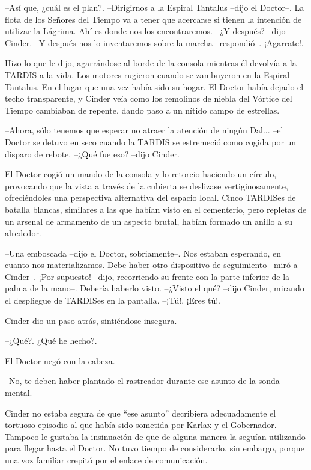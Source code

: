 --Así que, ¿cuál es el plan?.
--Dirigirnos a la Espiral Tantalus --dijo el Doctor--. La flota de los Señores del Tiempo va a tener que acercarse si tienen la intención de utilizar la Lágrima. Ahí es donde nos los encontraremos.
--¿Y después? --dijo Cinder.
--Y después nos lo inventaremos sobre la marcha --respondió--. ¡Agarrate!.

Hizo lo que le dijo, agarrándose al borde de la consola mientras él devolvía a la TARDIS a la vida. Los motores rugieron cuando se zambuyeron en la Espiral Tantalus. En el lugar que una vez había sido su hogar.
El Doctor había dejado el techo transparente, y Cinder veía como los remolinos de niebla del Vórtice del Tiempo cambiaban de repente, dando paso a un nítido campo de estrellas.

--Ahora, sólo tenemos que esperar no atraer la atención de ningún Dal... --el Doctor se detuvo en seco cuando la TARDIS se estremeció como cogida por un disparo de rebote.
--¿Qué fue eso? --dijo Cinder.

El Doctor cogió un mando de la consola y lo retorcio haciendo un círculo, provocando que la vista a través de la cubierta se deslizase vertiginosamente, ofreciéndoles una perspectiva alternativa del espacio local. Cinco TARDISes de batalla blancas, similares a las que habían visto en el cementerio, pero repletas de un arsenal de armamento de un aspecto brutal, habían formado un anillo a su alrededor.

--Una emboscada --dijo el Doctor, sobriamente--. Nos estaban esperando, en cuanto nos materializamos. Debe haber otro dispositivo de seguimiento --miró a Cinder--. ¡Por supuesto! --dijo, recorriendo su frente con la parte inferior de la palma de la mano--. Debería haberlo visto.
--¿Visto el qué? --dijo Cinder, mirando el despliegue de TARDISes en la pantalla.
--¡Tú!. ¡Eres tú!.

Cinder dio un paso atrás, sintiéndose insegura. 

--¿Qué?. ¿Qué he hecho?.

El Doctor negó con la cabeza. 

--No, te deben haber plantado el rastreador durante ese asunto de la sonda mental.

Cinder no estaba segura de que ``ese asunto'' decribiera adecuadamente el tortuoso episodio al que había sido sometida por Karlax y el Gobernador. Tampoco le gustaba la insinuación de que de alguna manera la seguían utilizando para llegar hasta el Doctor. No tuvo tiempo de considerarlo, sin embargo, porque una voz familiar crepitó por el enlace de comunicación.

